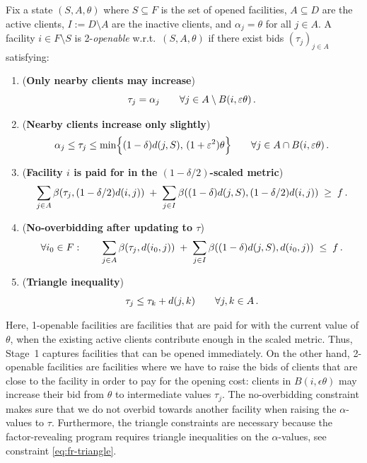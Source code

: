 \begin{definition}
    \label{def:openable-mod-2}
    Fix a state $(S,A,\theta)$ where $S\subseteq F$ is the set of opened facilities,
    $A\subseteq D$ are the active clients, $I:=D\setminus A$ are the inactive clients, and
    $\alpha_j=\theta$ for all $j\in A$.
    A facility $i\in F\setminus S$ is 2-\emph{openable} w.r.t.\ $(S,A,\theta)$ if there exist bids $(\tau_j)_{j\in A}$
    satisfying:
    \begin{enumerate}
        \item[\textbf{(i)}] (\textbf{Only nearby clients may increase})
              \[
                  \tau_j=\alpha_j \qquad \forall j\in A\setminus B(i,\varepsilon\theta)\,.
              \]
        \item[\textbf{(ii)}] (\textbf{Nearby clients increase only slightly})
              \[
                  \alpha_j \le \tau_j \leq \min\Bigl\{(1-\delta)d(j,S),\, (1+\varepsilon^2) \theta \Bigr\}
                  \qquad \forall j\in A\cap B(i,\varepsilon\theta)\,.
              \]
        \item[\textbf{(iii)}] (\textbf{Facility $i$ is paid for in the $(1-\delta/2)$-scaled metric})
              \[
                  \sum_{j\in A}\beta(\tau_j, (1- \delta/2)d(i,j))
                  \;+\;
                  \sum_{j\in I}\beta((1-\delta)d(j,S), (1- \delta/2)d(i,j))
                  \;\ge\; f\,.
              \]
        \item[\textbf{(iv)}] (\textbf{No-overbidding after updating to $\tau$})
              \[
                  \forall i_0\in F:\qquad
                  \sum_{j\in A}\beta(\tau_j,d(i_0,j))
                  \;+\;
                  \sum_{j\in I}\beta((1-\delta)  d(j,S), d(i_0,j))
                  \;\le\;  f\,.
              \]     
        \item[\textbf{(v)}] (\textbf{Triangle inequality})
              \[
                  \tau_j \le \tau_k + d(j,k)
                  \qquad \forall j,k\in A\,.
              \]
    \end{enumerate}
\end{definition}
Here, 1-openable facilities are facilities that are paid for with the current value of $\theta$, when the existing active clients contribute enough in the scaled metric.
Thus, Stage~1 captures facilities that can be opened immediately. 
On the other hand, 2-openable facilities are facilities where we have to raise the bids of clients that are close to the facility in order to pay for the opening cost: clients in $B(i,\epsilon \theta)$ may increase their bid from $\theta$ to intermediate values $\tau_j$.
The no-overbidding constraint makes sure that we do not overbid towards another facility when raising the $\alpha$-values to $\tau$.
Furthermore, the triangle constraints are necessary because the factor-revealing program requires triangle inequalities on the $\alpha$-values, see constraint \eqref{eq:fr-triangle}. %

